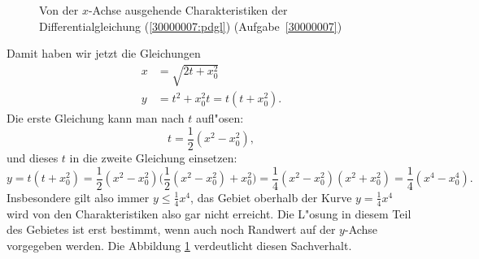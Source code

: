 \begin{loesung}
\begin{figure}
\begin{center}
\end{center}
\caption{Von der $x$-Achse ausgehende Charakteristiken der
Differentialgleichung (\ref{30000007:pdgl}) (Aufgabe~\ref{30000007})
\label{30000007:chardom}}
\end{figure}
Damit haben wir jetzt die Gleichungen
\begin{align*}
x&=\sqrt{2t+x_0^2}\\
y&=t^2+x_0^2t = t(t+x_0^2).
\end{align*}
Die erste Gleichung kann man nach $t$ aufl"osen:
\[
t=\frac12(x^2-x_0^2),
\]
und dieses $t$ in die zweite Gleichung einsetzen:
\begin{equation}
y=t(t+x_0^2)=\frac12(x^2-x_0^2)\biggl(\frac12(x^2-x_0^2)+x_0^2\biggr)
=\frac14(x^2-x_0^2)(x^2+x_0^2)=\frac14(x^4-x_0^4).
\label{30000007:char}
\end{equation}
Insbesondere gilt also immer $y\le\frac14x^4$, das Gebiet oberhalb
der Kurve $y=\frac14x^4$ wird von den Charakteristiken also gar nicht
erreicht. Die L"osung in diesem Teil des Gebietes ist erst bestimmt,
wenn auch noch Randwert auf der $y$-Achse vorgegeben werden. Die
Abbildung \ref{30000007:chardom} verdeutlicht diesen Sachverhalt.
\end{loesung}

